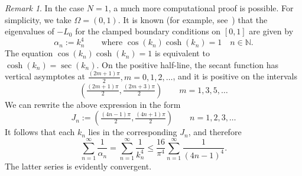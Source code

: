 \documentclass[a4paper, reqno]{amsart}
\numberwithin{equation}{section}
\theoremstyle{plain}
\theoremstyle{definition}
\theoremstyle{remark}
\newtheorem{remark}[theorem]{Remark}
\newcommand{\NN}{\mathbb{N}}
\begin{document}
\begin{remark}
  In the case $N=1$, a much more computational proof is possible. For simplicity, we take $\Omega = (0,1)$. It is known (for example, see~\cite[p.\,296]{CH}) that the eigenvalues of $-L_0$ for the clamped boundary conditions on $[0, 1]$ are given by
  \begin{equation}
    \alpha_n := k_n^4 \qquad \text{where } \cos(k_n)\cosh(k_n) = 1 \quad n \in \NN.
  \end{equation}
  The equation $\cos (k_n) \cosh (k_n) = 1$ is equivalent to $\cosh(k_n) = \sec(k_n)$. On the positive half-line, the secant function has vertical asymptotes at $\tfrac{(2m+1)\pi}{2}, m = 0, 1, 2, \ldots$, and it is positive on the intervals
  \begin{equation*}
    \left(\tfrac{(2m+1)\pi}{2}, \tfrac{(2m+3)\pi}{2} \right) \qquad m = 1, 3, 5, \ldots
  \end{equation*}
  We can rewrite the above expression in the form
  \begin{equation*}
    J_n := \left(\tfrac{(4n-1)\pi}{2}, \tfrac{(4n+1)\pi}{2} \right) \qquad n=1,2,3, \ldots
  \end{equation*}
  It follows that each $k_n$ lies in the corresponding $J_n$, and therefore
  \begin{equation*}
    \sum_{n=1}^\infty \frac{1}{\alpha_n} = \sum_{n=1}^\infty \frac{1}{k_n^4} \leq \frac{16}{\pi^4} \sum_{n=1}^\infty \frac{1}{(4n-1)^4}.
  \end{equation*}
  The latter series is evidently convergent.
\end{remark}
\end{document}
